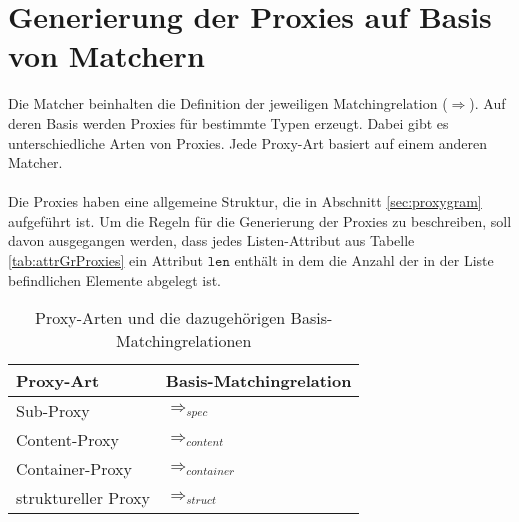 \documentclass[a4paper,12pt]{article}
\begin{document}
\section{Generierung der Proxies auf Basis von Matchern}
Die Matcher beinhalten die Definition der jeweiligen Matchingrelation ($\Rightarrow$). Auf deren Basis werden Proxies für bestimmte Typen erzeugt. Dabei gibt es unterschiedliche Arten von Proxies. Jede Proxy-Art basiert auf einem anderen Matcher.\\\\
Die Proxies haben eine allgemeine Struktur, die in Abschnitt \ref{sec:proxygram} aufgeführt ist. Um die Regeln für die Generierung der Proxies zu beschreiben, soll davon ausgegangen werden, dass jedes Listen-Attribut aus Tabelle \ref{tab:attrGrProxies} ein Attribut $\texttt{len}$ enthält in dem die Anzahl der in der Liste befindlichen Elemente abgelegt ist.







\begin{table}[H]
\centering
\begin{tabular}{|p{5cm}|p{5cm}|}
\hline
\hline
\centering\textbf{Proxy-Art} & \textbf{Basis-Matchingrelation} \\
\hline
\hline
Sub-Proxy
&  
$\Rightarrow_{spec}$
\\
\hline
Content-Proxy
& 
$\Rightarrow_{content}$
\\
\hline
Container-Proxy
& 
$\Rightarrow_{container}$
\\
\hline
struktureller Proxy
&
$\Rightarrow_{struct}$ \\
\hline
\hline
\end{tabular}
\caption{Proxy-Arten und die dazugehörigen Basis-Matchingrelationen}
 \label{tab:baseMatcher}
\end{table}
\end{document}
